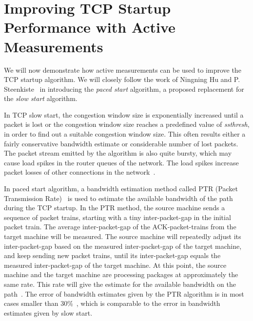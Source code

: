 
\section{Improving TCP Startup Performance with Active Measurements}

We will now demonstrate how active measurements can be used to improve the TCP startup algorithm. We will closely follow the work of Ningning Hu and P. Steenkiste~\cite{Hu03} in introducing the \textit{paced start} algorithm, a proposed replacement for the \textit{slow start} algorithm.

In TCP slow start, the congestion window size is exponentially increased until a packet is lost or the congestion window size reaches a predefined value of \textit{ssthresh}, in order to find out a suitable congestion window size. This often results either a fairly conservative bandwidth estimate or considerable number of lost packets. The packet stream emitted by the algorithm is also quite bursty, which may cause load spikes in the router queues of the network. The load spikes increase packet losses of other connections in the network~\cite{Hu03}.    

In paced start algorithm, a bandwidth estimation method called PTR (Packet Transmission Rate)~\cite{Hu03b} is used to estimate the available bandwidth of the path during the TCP startup. In the PTR method, the source machine sends a sequence of packet trains, starting with a tiny inter-packet-gap in the initial packet train. The average inter-packet-gap of the ACK-packet-trains from the target machine will be measured. The source machine will repeatedly adjust its inter-packet-gap based on the measured inter-packet-gap of the target machine, and keep sending new packet trains, until its inter-packet-gap equals the measured inter-packet-gap of the target machine. At this point, the source machine and the target machine are processing packages at approximately the same rate. This rate will give the estimate for the available bandwidth on the path~\cite{Hu03b}. The error of bandwidth estimates given by the PTR algorithm is in most cases smaller than 30\%~\cite{Hu03b}, which is comparable to the error in bandwidth estimates given by slow start.   

